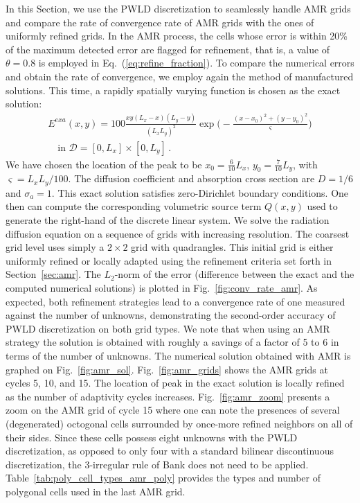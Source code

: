 \documentclass[preprint,10pt]{elsarticle}
\newcommand{\D}{\mathcal{D}}
\newcommand{\eqt}[1]{Eq.~(\ref{#1})}                     %
\newcommand{\fig}[1]{Fig.~\ref{#1}}                      %
\newcommand{\tbl}[1]{Table~\ref{#1}}                     %
\newcommand{\sct}[1]{Section~\ref{#1}}                   %
\begin{document}
In this Section, we use the PWLD discretization to seamlessly handle AMR grids and compare the rate
of convergence rate of AMR grids with the ones of uniformly refined grids. In the AMR process, the cells whose
error is within 20\% of the maximum detected error are flagged for refinement, that is, a value of 
$\theta=0.8$ is employed in \eqt{eq:refine_fraction}.
To compare the numerical errors and obtain the rate of convergence, we employ again the method of 
manufactured solutions. This time, a rapidly spatially varying function is chosen
as the exact solution:
%
\begin{multline}
	E^{\textit{exa}}(x,y) = 100 \frac{xy(L_x-x)(L_y-y)}{(L_x L_y)^2}\exp\Big(-\frac{(x-x_0)^2+(y-y_0)^2}{\varsigma}\Big) \\
	 \quad \text{in } \D=[0,L_x]\times [0,L_y] \,.
\end{multline}
%
We have chosen the location of the peak to be $x_0=\tfrac{6}{10}L_x$, $y_0=\tfrac{7}{10}L_y$, with $\varsigma=L_xL_y/100$. 
The diffusion coefficient and absorption cross section are  $D=1/6$ and $\sigma_a=1$. 
This exact solution satisfies zero-Dirichlet boundary conditions. One then can compute 
the corresponding volumetric source term $Q(x,y)$ used to generate the right-hand of the discrete linear system. 
We solve the radiation diffusion equation on a sequence of grids with increasing resolution. The coarsest grid level
uses simply a $2\times 2$ grid with quadrangles. This initial grid is either uniformly refined or locally adapted 
using the refinement criteria set forth in \sct{sec:amr}. The $L_2$-norm of the error (difference
between the exact and the computed numerical solutions) is plotted in \fig{fig:conv_rate_amr}. As expected, both refinement
strategies lead to a convergence rate of one measured against the number of unknowns, demonstrating the 
second-order accuracy of PWLD discretization on both grid types. We note that when using an AMR strategy 
the solution is obtained with roughly a savings of
a factor of 5 to 6 in terms of the number of unknowns. 
The numerical solution obtained with AMR is graphed on \fig{fig:amr_sol}.
\fig{fig:amr_grids} shows the AMR grids at cycles 5, 10, and 15. The location of peak in the exact solution is
locally refined as the number of adaptivity cycles increases. \fig{fig:amr_zoom} presents a zoom on the AMR grid of cycle 15
where one can note the presences of several (degenerated) octogonal cells surrounded by once-more refined neighbors on all 
of their sides. Since these cells possess eight unknowns with the PWLD discretization, as opposed to
only four with a standard bilinear discontinuous discretization, the 3-irregular rule of Bank does not need to be applied.
\tbl{tab:poly_cell_types_amr_poly} provides the types and number of polygonal cells used in the last AMR grid.
 
\end{document}
